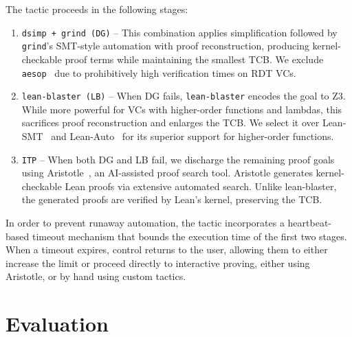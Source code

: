 \documentclass[sigplan,twocolumn,accept]{acmart}
\begin{document}
The tactic proceeds in the following stages:
\begin{enumerate}
    \item \label{step1} \texttt{dsimp + grind (DG)} -- This combination applies simplification followed by \texttt{grind}'s SMT-style automation with proof reconstruction, producing kernel-checkable proof terms while maintaining the smallest TCB. We exclude \texttt{aesop}~\cite{aesop_paper} due to prohibitively high verification times on RDT VCs.

    \item \label{step2} \texttt{lean-blaster (LB)} -- When DG fails, \texttt{lean-blaster} encodes the goal to Z3. While more powerful for VCs with higher-order functions and lambdas, this sacrifices proof reconstruction and enlarges the TCB. We select it over Lean-SMT~\cite{lean_smt} and Lean-Auto~\cite{lean_auto} for its superior support for higher-order functions.

    \item \label{step3} \texttt{ITP} -- When both DG and LB fail, we discharge the remaining proof goals using Aristotle~\cite{achim2025aristotleimolevelautomatedtheorem}, an AI-assisted proof search tool. Aristotle generates kernel-checkable Lean proofs via extensive automated search. Unlike lean-blaster, the generated proofs are verified by Lean's kernel, preserving the TCB.
\end{enumerate}

In order to prevent runaway automation, the \sal tactic incorporates a heartbeat-based timeout mechanism that bounds the execution time of the first two stages. When a timeout expires, control returns to the user, allowing them to either increase the limit or proceed directly to interactive proving, either using Aristotle, or by hand using custom tactics.

\section{Evaluation}
\end{document}
